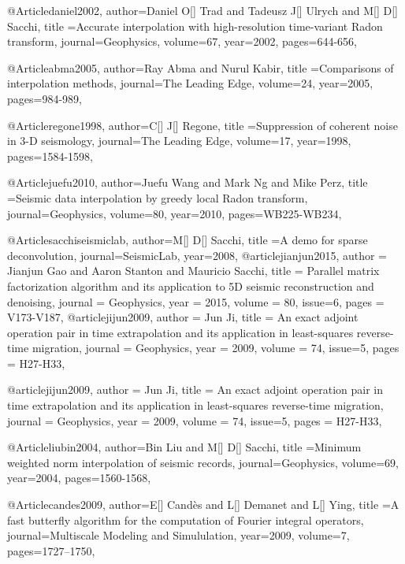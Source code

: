 @Article{daniel2002,
  author={Daniel O[] Trad and Tadeusz J[] Ulrych and M[] D[] Sacchi},
  title ={Accurate interpolation with high-resolution time-variant Radon transform},
  journal={Geophysics},
  volume=67,
  year=2002,
  pages={644-656},
}

@Article{abma2005,
  author={Ray Abma and Nurul Kabir},
  title ={Comparisons of interpolation methods},
  journal={The Leading Edge},
  volume=24,
  year=2005,
  pages={984-989},
}

@Article{regone1998,
  author={C[] J[] Regone},
  title ={Suppression of coherent noise in 3-{D} seismology},
  journal={The Leading Edge},
  volume=17,
  year=1998,
  pages={1584-1598},
}

@Article{juefu2010,
  author={Juefu Wang and Mark Ng and Mike Perz},
  title ={Seismic data interpolation by greedy local Radon transform},
  journal={Geophysics},
  volume=80,
  year=2010,
  pages={WB225-WB234},
}

@Article{sacchiseismiclab,
  author={M[] D[] Sacchi},
  title ={A demo for sparse deconvolution},
  journal={SeismicLab},
  year={2008},
}
@article{jianjun2015,
  author =	 {Jianjun Gao and Aaron Stanton and Mauricio Sacchi},
  title =	 {Parallel matrix factorization algorithm and its application to 5{D} seismic reconstruction and denoising},
  journal = 	 {Geophysics},
  year = 	 2015,
  volume =	 80,
    issue=6,
  pages =	 {V173-V187},
}
@article{jijun2009,
  author =	 {Jun Ji},
  title =	 {An exact adjoint operation pair in time extrapolation and its application in least-squares reverse-time migration},
  journal = 	 {Geophysics},
  year = 	 2009,
  volume =	 74,
    issue=5,
  pages =	 {H27-H33},
}

@article{jijun2009,
  author =	 {Jun Ji},
  title =	 {An exact adjoint operation pair in time extrapolation and its application in least-squares reverse-time migration},
  journal = 	 {Geophysics},
  year = 	 2009,
  volume =	 74,
    issue=5,
  pages =	 {H27-H33},
}

@Article{liubin2004,
  author={Bin Liu and M[] D[] Sacchi},
  title ={Minimum weighted norm interpolation of seismic records},
  journal={Geophysics},
  volume=69,
  year=2004,
  pages={1560-1568},
}

@Article{candes2009,
  author={E[] Cand\`{e}s and L[] Demanet and L[] Ying},
  title ={A fast butterfly algorithm for the computation of Fourier integral operators},
  journal={Multiscale Modeling and Simululation},
  year=2009,
  volume=7,
  pages={1727–1750},
}

